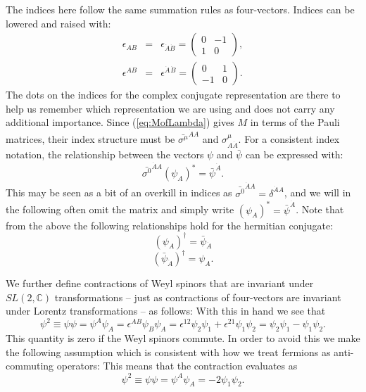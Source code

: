 \documentclass[notes.tex]{subfiles}
\begin{document}
The indices here follow the same summation rules as four-vectors. Indices can be lowered and raised with:
\begin{eqnarray}
\epsilon_{AB} &=& \epsilon_{\dot A \dot B} = \begin{pmatrix} 0 & -1\\ 1 & 0\end{pmatrix}, \label{eq:epsilonAB} \\
\epsilon^{AB} &=& \epsilon^{\dot{A}}{}^{\dot{B}} = \begin{pmatrix} 0 & 1\\ -1 & 0\end{pmatrix}.\label{eq:epsilonAdotBdot}
\end{eqnarray}
The dots on the indices for the complex conjugate representation are there to help us remember which representation we are using and does not carry any additional importance. 
Since (\ref{eq:MofLambda}) gives $M$ in terms of the Pauli matrices, their index structure must be $\bar{\sigma^\mu}^{\dot{A}A}$ and $\sigma^\mu_{A\dot{A}}$. 
For a consistent index notation, the relationship between the vectors $\psi$ and $\bar{\psi}$ can be expressed with:
\[\bar{\sigma^0}^{\dot{A}A}(\psi_A)^* = \bar{\psi}^{\dot{A}}.\]
This may be seen as a bit of an overkill in indices as $\bar{\sigma^0}^{\dot{A}A} = \delta^{\dot{A}A}$, and we will in the following often omit the matrix and simply write $(\psi_A)^* = \bar{\psi}^{\dot{A}}$.
Note that from the above the following relationships hold for the hermitian conjugate:
\[(\psi_A)^\dagger = \bar{\psi}_{\dot{A}}\]
\[(\bar{\psi}_{\dot{A}})^\dagger = \psi_A.\]

We further define contractions of Weyl spinors that are invariant under $SL(2,\mathbb{C})$ transformations -- just as  contractions of four-vectors are invariant under Lorentz transformations -- as follows:
With this in hand we see that 
\[\psi^2 \equiv \psi \psi = \psi^A\psi_A = \epsilon^{AB}\psi_B\psi_A = \epsilon^{12}\psi_2\psi_1 + \epsilon^{21}\psi_1\psi_2 = \psi_2\psi_1 - \psi_1\psi_2.\]
This quantity is zero if the Weyl spinors commute. In order to avoid this we make the following assumption which is consistent with how we treat fermions as anti-commuting operators:
This means that the contraction evaluates as
\[\psi^2 \equiv \psi \psi = \psi^A\psi_A = -2 \psi_1\psi_2.\]
\end{document}
